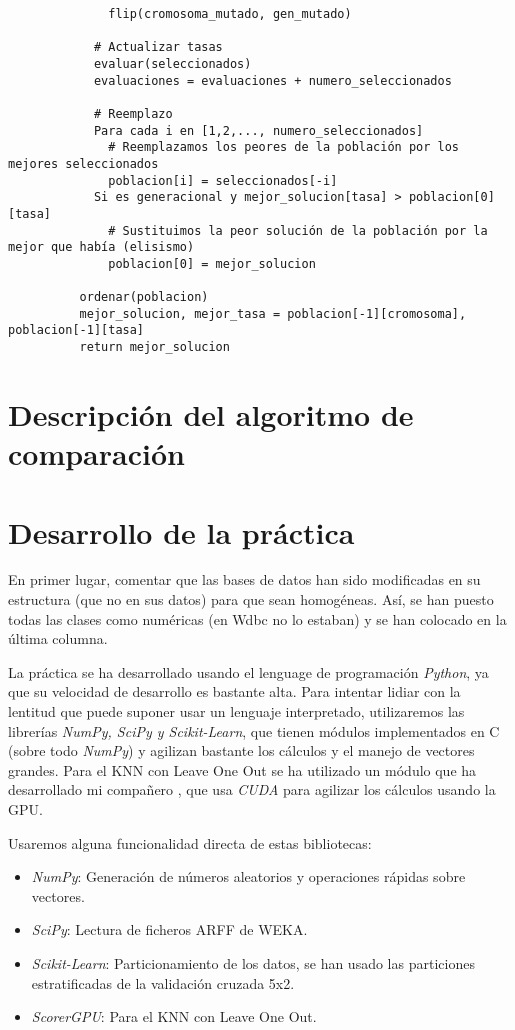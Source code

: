 \documentclass[a4paper, 11pt]{article}
\begin{document}
\begin{itemize}
\begin{verbatim}
              flip(cromosoma_mutado, gen_mutado)

            # Actualizar tasas
            evaluar(seleccionados)
            evaluaciones = evaluaciones + numero_seleccionados

            # Reemplazo
            Para cada i en [1,2,..., numero_seleccionados]
              # Reemplazamos los peores de la población por los mejores seleccionados
              poblacion[i] = seleccionados[-i]
            Si es generacional y mejor_solucion[tasa] > poblacion[0][tasa]
              # Sustituimos la peor solución de la población por la mejor que había (elisismo)
              poblacion[0] = mejor_solucion

          ordenar(poblacion)
          mejor_solucion, mejor_tasa = poblacion[-1][cromosoma], poblacion[-1][tasa]
          return mejor_solucion
        \end{verbatim}
    \end{itemize}


  \section{Descripción del algoritmo de comparación}
    
  \section{Desarrollo de la práctica}
    En primer lugar, comentar que las bases de datos han sido modificadas en su estructura (que no en sus datos) para que sean homogéneas. Así, se han puesto todas las clases como numéricas (en Wdbc no lo estaban) y se han colocado en la última columna.

    La práctica se ha desarrollado usando el lenguage de programación \emph{Python}, ya que su velocidad de desarrollo es bastante alta. Para intentar lidiar con la lentitud que puede suponer usar un lenguaje interpretado, utilizaremos las librerías \emph{NumPy, SciPy y Scikit-Learn}, que tienen módulos implementados en C (sobre todo \emph{NumPy}) y agilizan bastante los cálculos y el manejo de vectores grandes. Para el KNN con Leave One Out se ha utilizado un módulo que ha desarrollado mi compañero , que usa \emph{CUDA} para agilizar los cálculos usando la GPU.

    Usaremos alguna funcionalidad directa de estas bibliotecas:
    \begin{itemize}
      \item \emph{NumPy}: Generación de números aleatorios y operaciones rápidas sobre vectores.
      \item \emph{SciPy}: Lectura de ficheros ARFF de WEKA.
      \item \emph{Scikit-Learn}: Particionamiento de los datos, se han usado las particiones estratificadas de la validación cruzada 5x2.
      \item \emph{ScorerGPU}: Para el KNN con Leave One Out.
    \end{itemize}
\end{document}
